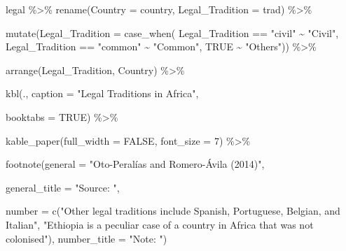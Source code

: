 \documentclass[a4paper,nobind]{templates/ociamthesis}
\newenvironment{Shaded}{\begin{snugshade}}{\end{snugshade}}
\newcommand{\AttributeTok}[1]{\textcolor[rgb]{0.77,0.63,0.00}{#1}}
\newcommand{\ConstantTok}[1]{\textcolor[rgb]{0.00,0.00,0.00}{#1}}
\newcommand{\DecValTok}[1]{\textcolor[rgb]{0.00,0.00,0.81}{#1}}
\newcommand{\FunctionTok}[1]{\textcolor[rgb]{0.00,0.00,0.00}{#1}}
\newcommand{\NormalTok}[1]{#1}
\newcommand{\SpecialCharTok}[1]{\textcolor[rgb]{0.00,0.00,0.00}{#1}}
\newcommand{\StringTok}[1]{\textcolor[rgb]{0.31,0.60,0.02}{#1}}
\renewenvironment{Shaded}
{
  \vspace{10pt}%
  \begin{snugshade}%
}{%
  \end{snugshade}%
  \vspace{8pt}%
}
\begin{document}
\begin{Shaded}
\begin{Highlighting}[]
\NormalTok{legal }\SpecialCharTok{\%\textgreater{}\%} \FunctionTok{rename}\NormalTok{(}\AttributeTok{Country =}\NormalTok{ country, }\AttributeTok{Legal\_Tradition =}\NormalTok{ trad) }\SpecialCharTok{\%\textgreater{}\%} 
  
  \FunctionTok{mutate}\NormalTok{(}\AttributeTok{Legal\_Tradition =} \FunctionTok{case\_when}\NormalTok{(}
\NormalTok{    Legal\_Tradition }\SpecialCharTok{==} \StringTok{"civil"} \SpecialCharTok{\textasciitilde{}} \StringTok{"Civil"}\NormalTok{,}
\NormalTok{    Legal\_Tradition }\SpecialCharTok{==} \StringTok{"common"} \SpecialCharTok{\textasciitilde{}} \StringTok{"Common"}\NormalTok{,}
    \ConstantTok{TRUE} \SpecialCharTok{\textasciitilde{}} \StringTok{"Others"}\NormalTok{)) }\SpecialCharTok{\%\textgreater{}\%} 
  
  \FunctionTok{arrange}\NormalTok{(Legal\_Tradition, Country) }\SpecialCharTok{\%\textgreater{}\%} 
  
  \FunctionTok{kbl}\NormalTok{(., }\AttributeTok{caption =} \StringTok{"Legal Traditions in Africa"}\NormalTok{, }
      
      \AttributeTok{booktabs =} \ConstantTok{TRUE}\NormalTok{) }\SpecialCharTok{\%\textgreater{}\%} 
  
  \FunctionTok{kable\_paper}\NormalTok{(}\AttributeTok{full\_width =} \ConstantTok{FALSE}\NormalTok{, }\AttributeTok{font\_size =} \DecValTok{7}\NormalTok{) }\SpecialCharTok{\%\textgreater{}\%} 
  
  \FunctionTok{footnote}\NormalTok{(}\AttributeTok{general =} \StringTok{"Oto{-}Peralías and Romero{-}Ávila (2014)"}\NormalTok{,}
           
           \AttributeTok{general\_title =} \StringTok{"Source: "}\NormalTok{,}
           
           \AttributeTok{number =} \FunctionTok{c}\NormalTok{(}\StringTok{"Other legal traditions include Spanish, Portuguese, Belgian, and Italian"}\NormalTok{, }\StringTok{"Ethiopia is a peculiar case of a country in Africa that was not colonised"}\NormalTok{),}
           \AttributeTok{number\_title =} \StringTok{"Note: "}\NormalTok{)}
\end{Highlighting}
\end{Shaded}
\end{document}
